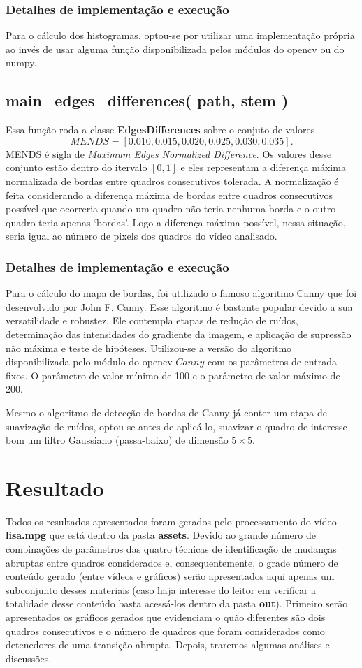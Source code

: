 \documentclass{article}
\begin{document}
\subsubsection{Detalhes de implementação e execução}
Para o cálculo dos histogramas, optou-se por utilizar uma implementação própria ao invés de usar alguma função disponibilizada pelos módulos do opencv ou do numpy.


%
\subsection{main\_edges\_differences( path, stem )}
Essa função roda a classe \textbf{EdgesDifferences} sobre o conjuto de valores
\[
    MENDS = [0.010, 0.015, 0.020, 0.025, 0.030, 0.035].
\]
MENDS é sigla de \textit{Maximum Edges Normalized Difference}. Os valores desse conjunto estão dentro do itervalo $[0,1]$ e eles representam a diferença máxima normalizada de bordas entre quadros consecutivos tolerada. A normalização é feita considerando a diferença máxima de bordas entre quadros consecutivos possível que ocorreria quando um quadro não teria nenhuma borda e o outro quadro teria apenas `bordas'. Logo a diferença máxima possível, nessa situação, seria igual ao número de pixels dos quadros do vídeo analisado.


%
\subsubsection{Detalhes de implementação e execução}
Para o cálculo do mapa de bordas, foi utilizado o famoso algoritmo Canny que foi desenvolvido por John F. Canny. Esse algoritmo é bastante popular devido a sua versatilidade e robustez. Ele contempla etapas de redução de ruídos, determinação das intensidades do gradiente da imagem, e aplicação de supressão não máxima e teste de hipóteses. Utilizou-se a versão do algoritmo disponibilizada pelo módulo do opencv $Canny$ com os parâmetros de entrada fixos. O parâmetro de valor mínimo de 100 e o parâmetro de valor máximo de 200. 

Mesmo o algoritmo de detecção de bordas de Canny já conter um etapa de suavização de ruídos, optou-se antes de aplicá-lo, suavizar o quadro de interesse bom um filtro Gaussiano (passa-baixo) de dimensão $5\times5$.


\section{Resultado}
Todos os resultados apresentados foram gerados pelo processamento do vídeo \textbf{lisa.mpg} que está dentro da pasta \textbf{assets}. Devido ao grande número de combinações de parâmetros das quatro técnicas de identificação de mudanças abruptas entre quadros considerados e, consequentemente, o grade número de conteúdo gerado (entre vídeos e gráficos) serão apresentados aqui apenas um subconjunto desses materiais (caso haja interesse do leitor em verificar a totalidade desse conteúdo basta acessá-los dentro da pasta \textbf{out}). Primeiro serão apresentados os gráficos gerados que evidenciam o quão diferentes são dois quadros consecutivos e o número de quadros que foram considerados como detenedores de uma transição abrupta. Depois, traremos algumas análises e discussões.
\end{document}
